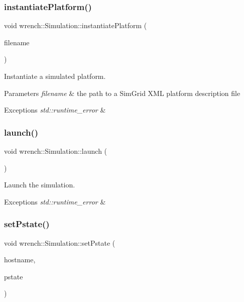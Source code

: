 \subsubsection{\texorpdfstring{instantiate\+Platform()}{instantiatePlatform()}}
{\footnotesize\ttfamily void wrench\+::\+Simulation\+::instantiate\+Platform (\begin{DoxyParamCaption}\item[{std\+::string}]{filename }\end{DoxyParamCaption})}



Instantiate a simulated platform. 


\begin{DoxyParams}{Parameters}
{\em filename} & the path to a Sim\+Grid X\+ML platform description file\\
\hline
\end{DoxyParams}

\begin{DoxyExceptions}{Exceptions}
{\em std\+::runtime\+\_\+error} & \\
\hline
\end{DoxyExceptions}
\mbox{\label{classwrench_1_1_simulation_ae9589632de9a2311ed1d7f7747478985}} 
\subsubsection{\texorpdfstring{launch()}{launch()}}
{\footnotesize\ttfamily void wrench\+::\+Simulation\+::launch (\begin{DoxyParamCaption}{ }\end{DoxyParamCaption})}



Launch the simulation. 


\begin{DoxyExceptions}{Exceptions}
{\em std\+::runtime\+\_\+error} & \\
\hline
\end{DoxyExceptions}
\mbox{\label{classwrench_1_1_simulation_adf4675a8c9c62c93bfbd3dc4a4e46556}} 
\subsubsection{\texorpdfstring{set\+Pstate()}{setPstate()}}
{\footnotesize\ttfamily void wrench\+::\+Simulation\+::set\+Pstate (\begin{DoxyParamCaption}\item[{const std\+::string \&}]{hostname,  }\item[{int}]{pstate }\end{DoxyParamCaption})}



